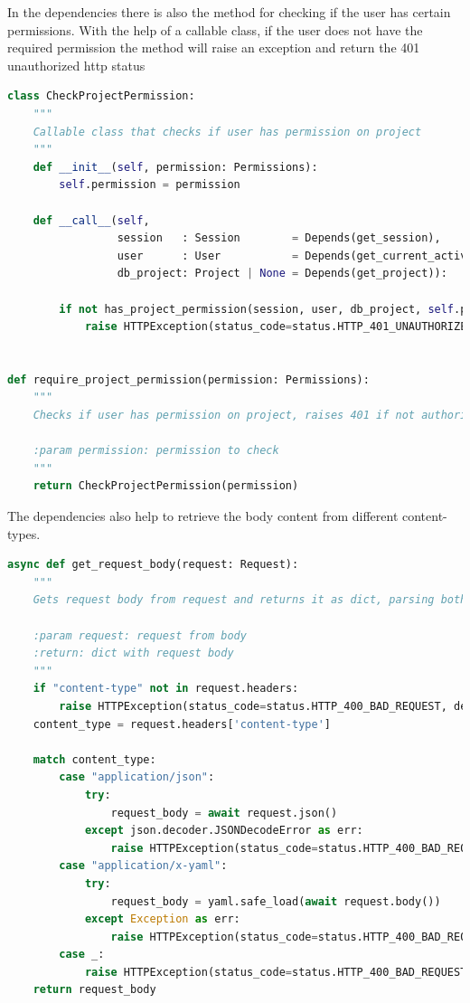 \documentclass[12pt]{report}
\begin{document}
In the dependencies there is also the method for checking if the user has certain permissions.
With the help of a callable class, if the user does not have the required permission the method will raise an exception and return the 401 unauthorized http status

\begin{lstlisting}[language=Python, caption=Check Project Permission]
class CheckProjectPermission:
    """
    Callable class that checks if user has permission on project
    """
    def __init__(self, permission: Permissions):
        self.permission = permission

    def __call__(self,
                 session   : Session        = Depends(get_session),
                 user      : User           = Depends(get_current_active_user),
                 db_project: Project | None = Depends(get_project)):

        if not has_project_permission(session, user, db_project, self.permission):
            raise HTTPException(status_code=status.HTTP_401_UNAUTHORIZED, detail="Unauthorized")


def require_project_permission(permission: Permissions):
    """
    Checks if user has permission on project, raises 401 if not authorized

    :param permission: permission to check
    """
    return CheckProjectPermission(permission)
\end{lstlisting}

The dependencies also help to retrieve the body content from different content-types.

\begin{lstlisting}[language=Python, caption=Get request body]
async def get_request_body(request: Request):
    """
    Gets request body from request and returns it as dict, parsing both json and yaml

    :param request: request from body
    :return: dict with request body
    """
    if "content-type" not in request.headers:
        raise HTTPException(status_code=status.HTTP_400_BAD_REQUEST, detail="Missing Content-Type in header")
    content_type = request.headers['content-type']

    match content_type:
        case "application/json":
            try:
                request_body = await request.json()
            except json.decoder.JSONDecodeError as err:
                raise HTTPException(status_code=status.HTTP_400_BAD_REQUEST, detail=str(err))
        case "application/x-yaml":
            try:
                request_body = yaml.safe_load(await request.body())
            except Exception as err:
                raise HTTPException(status_code=status.HTTP_400_BAD_REQUEST, detail=str(err))
        case _:
            raise HTTPException(status_code=status.HTTP_400_BAD_REQUEST)
    return request_body
\end{lstlisting}
\end{document}
